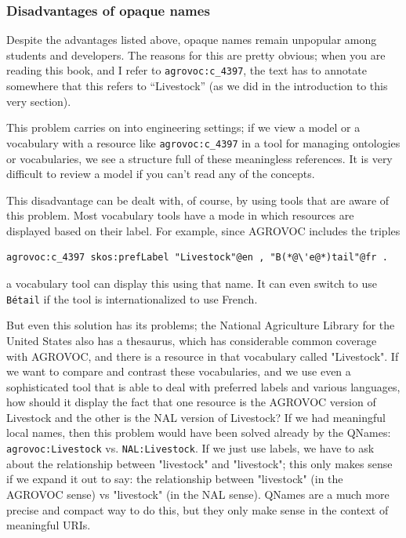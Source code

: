\subsubsection{Disadvantages of opaque names}

Despite the advantages listed above, opaque names remain unpopular among students 
and developers.  The reasons for this are pretty obvious; when you are reading this 
book, and I refer to \texttt{agrovoc:c\_4397}, the text has to annotate somewhere that this
refers to ``Livestock'' (as we did in the introduction to this very section).   

This problem carries on into engineering settings; if we view a model or a vocabulary with 
a resource like \texttt{agrovoc:c\_4397} in a tool for managing ontologies or 
vocabularies, we see a structure full of these meaningless references.  It 
is very difficult to review a model if you can't read any of the concepts. 

This disadvantage can be dealt with, of course, by using tools that are aware of this 
problem.  Most vocabulary tools have a mode in which resources are displayed based on 
their label.  For example,  since AGROVOC includes the triples


\begin{lstlisting}
agrovoc:c_4397 skos:prefLabel "Livestock"@en , "B(*@\'e@*)tail"@fr .
\end{lstlisting}


a vocabulary tool can display this using that name.  It can even switch to use
\texttt{B\'etail} if the tool is internationalized to use French. 

But even this solution has its problems; the National Agriculture Library for the
United States also has a thesaurus, which has considerable common coverage with 
AGROVOC, and there is a resource in that vocabulary called "Livestock".  If 
we want to compare and contrast these vocabularies, and we use even a 
sophisticated  tool that 
is able to deal with preferred labels and various languages, how should it display the
fact that one resource is the AGROVOC version of Livestock and the other is
the NAL version of Livestock?  If we had meaningful local names, then this
problem would have been solved already by the QNames:  
\texttt{agrovoc:Livestock} vs. \texttt{NAL:Livestock}.  If we just use labels, 
we have to ask about the relationship between "livestock" and "livestock"; this only makes sense
if we expand it out to say: the relationship between "livestock" (in the AGROVOC sense) vs "livestock" 
(in the NAL sense).  QNames are a much more precise and compact way to do this, but they only make
sense in the context of meaningful URIs. 

